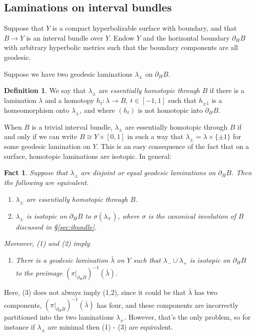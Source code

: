 \documentclass[12pt]{amsart}
\newtheorem{fact}[theorem]{Fact}
\theoremstyle{definition}
\newtheorem{definition}[theorem]{Definition}
\theoremstyle{remark}
\begin{document}
\subsection{Laminations on interval bundles}
\label{laminterval}
Suppose that $Y$ is a compact hyperbolizable surface with boundary, and that $B\longrightarrow Y$ is an interval bundle over $Y$. Endow $Y$ and the horizontal boundary $\partial_H B$ with arbitrary hyperbolic metrics such that the boundary components are all geodesic.

Suppose we have two geodesic laminations $\lambda_\pm$ on $\partial_H B$.

\begin{definition} 
 We say that $\lambda_\pm$ are \emph{essentially homotopic through $B$} if there is a lamination $\lambda$ and a homotopy
$h_t : \lambda  \longrightarrow B, \ t\in [-1,1]$
such that $h_{\pm 1}$ is a homeomorphism onto $\lambda_\pm$, and where $(h_t)$ is not homotopic into $\partial_H B$.
\end{definition}

When $B$ is a trivial interval bundle, $\lambda_\pm$ are essentially homotopic through $B$ if and only if we can write $B\cong Y \times [0,1]$ in such a way that $\lambda_\pm=\lambda \times\{\pm 1\}$ for some  geodesic lamination on $Y$. This is an easy consequence of the fact that on a surface, homotopic laminations are isotopic. In general:

\begin{fact}\label{homotopy involutoin}
Suppose that $\lambda_\pm$ are disjoint or equal geodesic laminations on $\partial_HB $. Then the following are equivalent.
	\begin{enumerate}
		\item $\lambda_\pm$ are essentially homotopic through $B$.
		\item $\lambda_\pm$ is isotopic on $\partial_H B$ to $\sigma(\lambda_\mp)$, where $\sigma$ is the canonical involution of $B$ discussed in \S\ref{sec:ibundle}.
	\end{enumerate}
Moreover, (1) and (2) imply
\begin{enumerate}
	\item[$(3)$] There is a geodesic lamination $\bar \lambda$ on $Y$ such that $\lambda_-\cup \lambda_+$ is isotopic on $\partial_HB$ to the preimage $ (\pi|_{\partial_HB})^{-1}(\bar \lambda)$.
\end{enumerate}
\end{fact}

Here, (3) does not always imply (1,2), since it could be that $\bar \lambda$ has two components, $ (\pi|_{\partial_HB})^{-1}(\bar \lambda)$ has four, and these components are incorrectly partitioned into the two laminations $\lambda_\pm$. However, that's the only problem, so for instance if $\lambda_\pm$ are minimal then (1) - (3) are equivalent.
\end{document}
